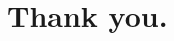 \documentclass[12pt, aspectratio=169]{beamer}
\begin{document}
    \section*{Thank you.}



\end{document}
